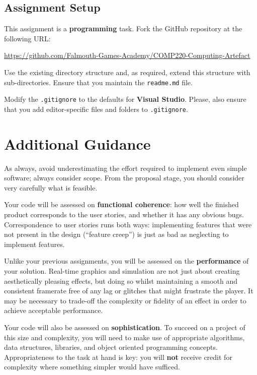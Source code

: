 \documentclass{../../fal_assignment}
\begin{document}
\subsection*{Assignment Setup}

This assignment is a \textbf{programming} task. Fork the GitHub repository at the following URL:

\indent \url{https://github.com/Falmouth-Games-Academy/COMP220-Computing-Artefact}

Use the existing directory structure and, as required, extend this structure with sub-directories.
Ensure that you maintain the \texttt{readme.md} file.

Modify the \texttt{.gitignore} to the defaults for \textbf{Visual Studio}.
Please, also ensure that you add editor-specific files and folders to \texttt{.gitignore}. 


\section*{Additional Guidance}

As always, avoid underestimating the effort required to implement even simple software; always consider scope.
From the proposal stage, you should consider very carefully what is feasible.

Your code will be assessed on \textbf{functional coherence}:
how well the finished product corresponds to the user stories,
and whether it has any obvious bugs.
Correspondence to user stories runs both ways:
implementing features that were not present in the design (``feature creep'')
is just as bad as neglecting to implement features.

Unlike your previous assignments,
you will be assessed on the \textbf{performance} of your solution.
Real-time graphics and simulation are not just about creating aesthetically pleasing effects,
but doing so whilst maintaining a smooth and consistent framerate free of any lag or glitches that might frustrate the player.
It may be necessary to trade-off the complexity or fidelity of an effect
in order to achieve acceptable performance.

Your code will also be assessed on \textbf{sophistication}.
To succeed on a project of this size and complexity,
you will need to make use of appropriate algorithms, data structures, libraries, and object oriented programming concepts.
Appropriateness to the task at hand is key:
you will \textbf{not} receive credit for complexity  
where something simpler would have sufficed.
\end{document}
